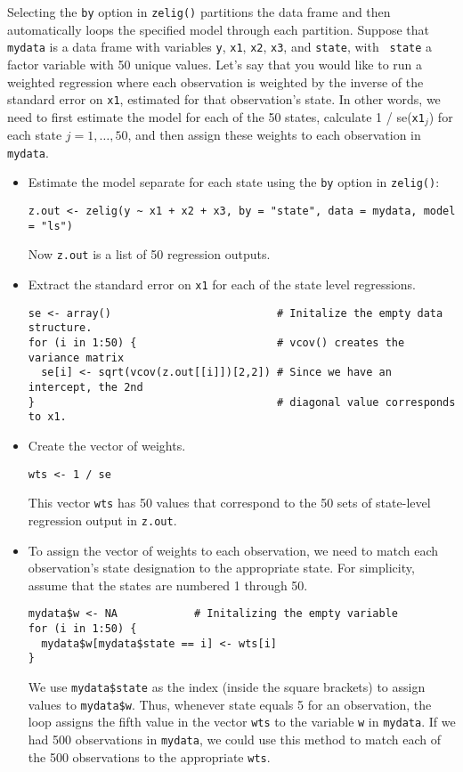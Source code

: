 Selecting the {\tt by} option in {\tt zelig()} partitions the data
frame and then automatically loops the specified model through each
partition.  Suppose that {\tt mydata} is a data frame with variables
{\tt y}, {\tt x1}, {\tt x2}, {\tt x3}, and {\tt state}, with {\tt
state} a factor variable with 50 unique values.  Let's say that you
would like to run a weighted regression where each observation is
weighted by the inverse of the standard error on {\tt x1}, estimated
for that observation's state.  In other words, we need 
to first estimate the model for each of the 50 states, calculate 1 /
{\sc se}({\tt x1}$_j$) for each state $j = 1, \dots, 50$, and then
assign these weights to each observation in {\tt mydata}.    
\begin{itemize}
\item Estimate the model separate for each state using the {\tt by}
option in {\tt zelig()}:  
\begin{verbatim}
z.out <- zelig(y ~ x1 + x2 + x3, by = "state", data = mydata, model = "ls")
\end{verbatim}
Now {\tt z.out} is a list of 50 regression outputs.  
\item Extract the standard error on {\tt x1} for each of the state
level regressions.  
\begin{verbatim}
se <- array()                          # Initalize the empty data structure.
for (i in 1:50) {                      # vcov() creates the variance matrix
  se[i] <- sqrt(vcov(z.out[[i]])[2,2]) # Since we have an intercept, the 2nd 
}                                      # diagonal value corresponds to x1.
\end{verbatim}
\item Create the vector of weights.  
\begin{verbatim}
wts <- 1 / se
\end{verbatim}
This vector {\tt wts} has 50 values that correspond to the 50 sets of
state-level regression output in {\tt z.out}.  
\item To assign the vector of weights to each observation, we need to
match each observation's state designation to the appropriate state.
For simplicity, assume that the states are numbered 1 through 50.
\begin{verbatim}
mydata$w <- NA            # Initalizing the empty variable
for (i in 1:50) { 
  mydata$w[mydata$state == i] <- wts[i]
} 
\end{verbatim}
We use {\tt mydata\$state} as the index (inside the square brackets)
to assign values to {\tt mydata\$w}.  Thus, whenever state equals 5
for an observation, the loop assigns the fifth value in the vector
{\tt wts} to the variable {\tt w} in {\tt mydata}.  If we had 500
observations in {\tt mydata}, we could use this method to match each
of the 500 observations to the appropriate {\tt wts}.


\end{itemize}
